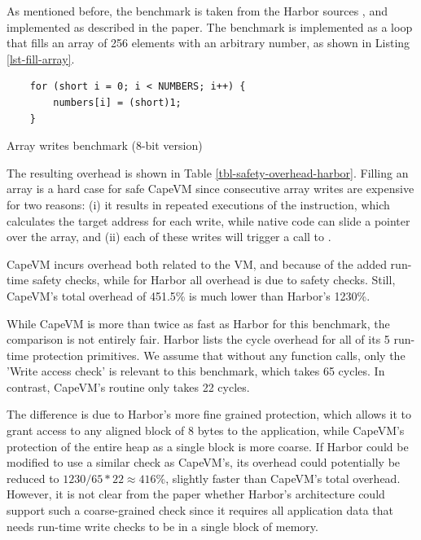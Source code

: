As mentioned before, the  benchmark is taken from the Harbor sources \cite{sos-operating-system}, and  implemented as described in the paper. The  benchmark is implemented as a loop that fills an array of 256 elements with an arbitrary number, as shown in Listing \ref{lst-fill-array}.


\begin{listing}
\begin{verbatim}
    for (short i = 0; i < NUMBERS; i++) {
        numbers[i] = (short)1;
    }
\end{verbatim}
\caption{Array writes benchmark (8-bit version)}
\label{lst-fill-array}
\end{listing}




The resulting overhead is shown in Table \ref{tbl-safety-overhead-harbor}. Filling an array is a hard case for safe CapeVM since consecutive array writes are expensive for two reasons: (i) it results in repeated executions of the  instruction, which calculates the target address for each write, while native code can slide a pointer over the array, and (ii) each of these writes will trigger a call to .

CapeVM incurs overhead both related to the VM, and because of the added run-time safety checks, while for Harbor all overhead is due to safety checks. Still, CapeVM's total overhead of 451.5\% is much lower than Harbor's 1230\%.

While CapeVM is more than twice as fast as Harbor for this benchmark, the comparison is not entirely fair. Harbor lists the cycle overhead for all of its 5 run-time protection primitives. We assume that without any function calls, only the 'Write access check' is relevant to this benchmark, which takes 65 cycles. In contrast, CapeVM's  routine only takes 22 cycles.

The difference is due to Harbor's more fine grained protection, which allows it to grant access to any aligned block of 8 bytes to the application, while CapeVM's protection of the entire heap as a single block is more coarse. If Harbor could be modified to use a similar check as CapeVM's, its overhead could potentially be reduced to $1230 / 65 * 22 \approx 416\%$, slightly faster than CapeVM's total overhead. However, it is not clear from the paper whether Harbor's architecture could support such a coarse-grained check since it requires all application data that needs run-time write checks to be in a single block of memory.

